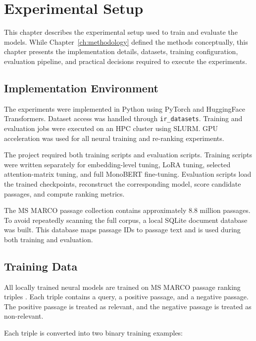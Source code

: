 \chapter{Experimental Setup}
\label{ch:experiments}

This chapter describes the experimental setup used to train and evaluate the models. While Chapter~\ref{ch:methodology} defined the methods conceptually, this chapter presents the implementation details, datasets, training configuration, evaluation pipeline, and practical decisions required to execute the experiments.

\section{Implementation Environment}
\label{sec:experiments_environment}

The experiments were implemented in Python using PyTorch and HuggingFace Transformers. Dataset access was handled through \texttt{ir\_datasets}. Training and evaluation jobs were executed on an HPC cluster using SLURM. GPU acceleration was used for all neural training and re-ranking experiments.

The project required both training scripts and evaluation scripts. Training scripts were written separately for embedding-level tuning, LoRA tuning, selected attention-matrix tuning, and full MonoBERT fine-tuning. Evaluation scripts load the trained checkpoints, reconstruct the corresponding model, score candidate passages, and compute ranking metrics.

The MS MARCO passage collection contains approximately 8.8 million passages. To avoid repeatedly scanning the full corpus, a local SQLite document database was built. This database maps passage IDs to passage text and is used during both training and evaluation.

\section{Training Data}
\label{sec:experiments_training_data}

All locally trained neural models are trained on MS MARCO passage ranking triples \cite{nguyen2016msmarco}. Each triple contains a query, a positive passage, and a negative passage. The positive passage is treated as relevant, and the negative passage is treated as non-relevant.

Each triple is converted into two binary training examples:

